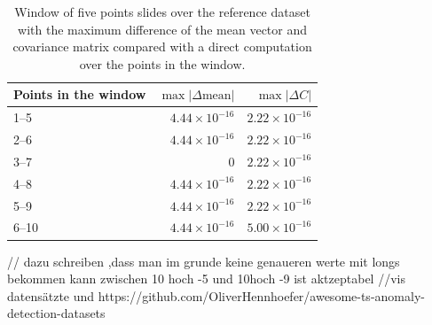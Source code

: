 \begin{table}[H]
    \centering
    \begin{tabular}{lrr}
        \toprule
        Points in the window & $\max |\Delta \text{mean}|$ & $\max |\Delta C|$ \\
        \midrule
        1--5  & $4.44 \times 10^{-16}$ & $2.22 \times 10^{-16}$ \\
        2--6  & $4.44 \times 10^{-16}$ & $2.22 \times 10^{-16}$ \\
        3--7  & 0                      & $2.22 \times 10^{-16}$ \\
        4--8  & $4.44 \times 10^{-16}$ & $2.22 \times 10^{-16}$ \\
        5--9  & $4.44 \times 10^{-16}$ & $2.22 \times 10^{-16}$ \\
        6--10 & $4.44 \times 10^{-16}$ & $5.00 \times 10^{-16}$ \\
        \bottomrule
    \end{tabular}
    \caption{Window of five points slides over the reference dataset with the maximum difference of the mean vector and covariance matrix compared with a direct computation over the points in the window.}
    \label{tab:smithSliding}
\end{table}

// dazu schreiben ,dass man im grunde keine genaueren werte mit longs bekommen kann zwischen 10 hoch -5 und 10hoch -9 ist aktzeptabel
//vis datensätzte und https://github.com/OliverHennhoefer/awesome-ts-anomaly-detection-datasets
